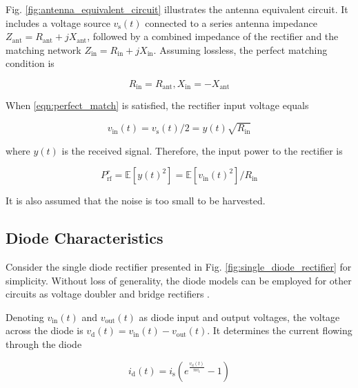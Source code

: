 Fig. \ref{fig:antenna_equivalent_circuit} illustrates the antenna equivalent circuit. It includes a voltage source ${v_{\text{s}}}(t)$ connected to a series antenna impedance ${Z_{{\text{ant}}}} = {R_{{\text{ant}}}} + j{X_{{\text{ant}}}}$, followed by a combined impedance of the rectifier and the matching network ${Z_{{\text{in}}}} = {R_{{\text{in}}}} + j{X_{{\text{in}}}}$. Assuming lossless, the perfect matching condition is

\begin{equation}\label{eqn:perfect_match}
  {R_{{\text{in}}}} = {R_{{\text{ant}}}},{X_{{\text{in}}}} =  - {X_{{\text{ant}}}}
\end{equation}

When \eqref{eqn:perfect_match} is satisfied, the rectifier input voltage equals

\begin{equation}\label{eqn:rectifier_input_voltage}
  {v_{{\text{in}}}}(t) = {v_{\text{s}}}(t)/2 = y(t)\sqrt {{R_{{\text{in}}}}}
\end{equation}

where ${y(t)}$ is the received signal. Therefore, the input power to the rectifier is

\begin{equation}\label{eqn:rectifier_input_power}
  P_{{\text{rf}}}^r = \mathbb{E}\left[ {y{{(t)}^2}} \right] = \mathbb{E}\left[ {{v_{{\text{in}}}}{{(t)}^2}} \right]/{R_{{\text{in}}}}
\end{equation}

It is also assumed that the noise is too small to be harvested.



\subsection{Diode Characteristics}\label{sec:diode-characteristics}
Consider the single diode rectifier presented in Fig. \ref{fig:single_diode_rectifier} for simplicity. Without loss of generality, the diode models can be employed for other circuits as voltage doubler and bridge rectifiers \cite{Clerckx2017}.

Denoting ${v_{{\text{in}}}}(t)$ and ${v_{{\text{out}}}}(t)$ as diode input and output voltages, the voltage across the diode is ${v_{\text{d}}}(t) = {v_{{\text{in}}}}(t) - {v_{{\text{out}}}}(t)$. It determines the current flowing through the diode

\begin{equation}\label{eqn:diode_characteristics}
  {i_{\text{d}}}(t) = {i_{\text{s}}}\left( {{e^{\frac{{{v_{\text{d}}}(t)}}{{n{v_{\text{t}}}}}}} - 1} \right)
\end{equation}

